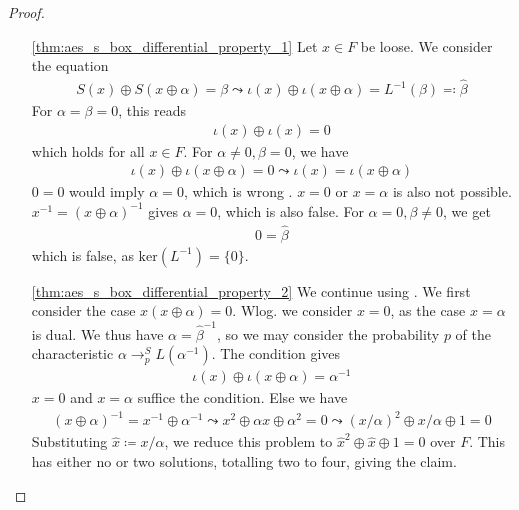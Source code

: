 \documentclass[10pt]{amsart}
\theoremstyle{definition}
\theoremstyle{remark}
\begin{document}
    \begin{proof}
        \begin{enumerate}[wide]
            \item[\ref{thm:aes_s_box_differential_property_1}] Let \(x \in F\) be loose. We consider the equation
            \begin{align}
                S(x) \oplus S(x \oplus \alpha) = \beta \leadsto \iota(x) \oplus \iota(x \oplus \alpha) = L^{-1}(\beta) \eqqcolon \hat{\beta} \label{eq:aes_s_box_differential_property_1}
            \end{align}
            For \(\alpha = \beta = 0\), this reads
            \begin{align}
                \iota(x) \oplus \iota(x) = 0
            \end{align}
            which holds for all \(x \in F\). For \(\alpha \neq 0, \beta = 0\), we have
            \begin{align}
                \iota(x) \oplus \iota(x \oplus \alpha) = 0 \leadsto \iota(x) = \iota(x \oplus \alpha)
            \end{align}
            \(0 = 0\) would imply \(\alpha = 0\), which is wrong \lightning. \(x = 0\) or \(x = \alpha\) is also not possible. \(x^{-1} = (x \oplus \alpha)^{-1}\) gives \(\alpha = 0\), which is also false. For \(\alpha = 0, \beta \neq 0\), we get
            \begin{align}
                0 = \hat{\beta}
            \end{align}
            which is false, as \(\text{ker}(L^{-1}) = \{0\}\).
            \item[\ref{thm:aes_s_box_differential_property_2}] We continue using . We first consider the case \(x(x \oplus \alpha) = 0\). Wlog. we consider \(x = 0\), as the case \(x = \alpha\) is dual. We thus have \(\alpha = \hat{\beta}^{-1}\), so we may consider the probability \(p\) of the characteristic \(\alpha \to_p^S L(\alpha^{-1})\). The condition gives
            \begin{align}
                \iota(x) \oplus \iota(x \oplus \alpha) = \alpha^{-1}
            \end{align}
            \(x = 0\) and \(x = \alpha\) suffice the condition. Else we have
            \begin{align}
                (x \oplus \alpha)^{-1} = x^{-1} \oplus \alpha^{-1} \leadsto x^2 \oplus \alpha x \oplus \alpha^2 = 0 \leadsto (x/\alpha)^2 \oplus x/\alpha \oplus 1 = 0
            \end{align}
            Substituting \(\hat{x} \coloneqq x/\alpha\), we reduce this problem to \(\hat{x}^2 \oplus \hat{x} \oplus 1 = 0\) over \(F\). This has either no or two solutions, totalling two to four, giving the claim.
            

\end{enumerate}
\end{proof}
\end{document}
